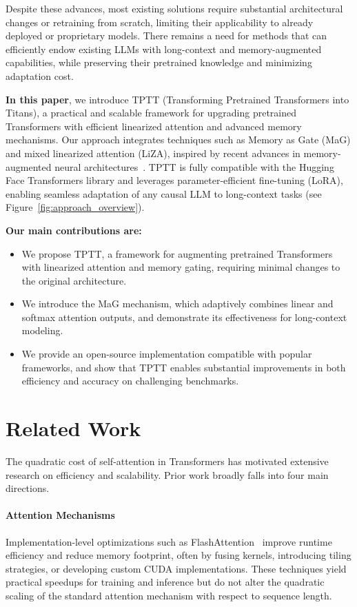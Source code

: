 \documentclass[10pt,a4paper]{article}
\begin{document}
Despite these advances, most existing solutions require substantial architectural changes or retraining from scratch, limiting their applicability to already deployed or proprietary models. There remains a need for methods that can efficiently endow existing LLMs with long-context and memory-augmented capabilities, while preserving their pretrained knowledge and minimizing adaptation cost.

\textbf{In this paper}, we introduce TPTT (Transforming Pretrained Transformers into Titans), a practical and scalable framework for upgrading pretrained Transformers with efficient linearized attention and advanced memory mechanisms. Our approach integrates techniques such as Memory as Gate (MaG) and mixed linearized attention (LiZA), inspired by recent advances in memory-augmented neural architectures~\cite{behrouz2024titans, behrouz2025s}. TPTT is fully compatible with the Hugging Face Transformers library and leverages parameter-efficient fine-tuning (LoRA), enabling seamless adaptation of any causal LLM to long-context tasks (see Figure~\ref{fig:approach_overview}).


\textbf{Our main contributions are:}


\begin{itemize}
    \item We propose TPTT, a framework for augmenting pretrained Transformers with linearized attention and memory gating, requiring minimal changes to the original architecture.
    \item We introduce the MaG mechanism, which adaptively combines linear and softmax attention outputs, and demonstrate its effectiveness for long-context modeling.
    \item We provide an open-source implementation compatible with popular frameworks, and show that TPTT enables substantial improvements in both efficiency and accuracy on challenging benchmarks.
\end{itemize}

\section{Related Work}

The quadratic cost of self-attention in Transformers has motivated extensive research on efficiency and scalability. Prior work broadly falls into four main directions.

\paragraph{Attention Mechanisms}  
Implementation-level optimizations such as FlashAttention~\cite{dao2023flashattention} improve runtime efficiency and reduce memory footprint, often by fusing kernels, introducing tiling strategies, or developing custom CUDA implementations. These techniques yield practical speedups for training and inference but do not alter the quadratic scaling of the standard attention mechanism with respect to sequence length.
\end{document}
